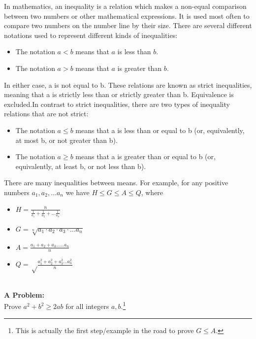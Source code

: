\begin{mathbox}{}
    {In mathematics, an inequality is a relation which makes a non-equal comparison between two numbers or other mathematical expressions.
    It is used most often to compare two numbers on the number line by their size. There are several different notations used to represent different kinds of inequalities:
    \begin{itemize}
        \item{The notation $a < b$ means that $a$ is less than $b$.}
        \item{The notation $a > b$ means that $a$ is greater than $b$.}
    \end{itemize}
    In either case, a is not equal to b. These relations are known as strict inequalities, meaning that a is strictly less than or strictly greater than b. Equivalence is excluded.In contrast to strict inequalities, there are two types of inequality relations that are not strict:
    \begin{itemize}
        \item{The notation $a \leq b$  means that a is less than or equal to b (or, equivalently, at most b, or not greater than b).}
        \item{The notation $a \geq b$  means that a is greater than or equal to b (or, equivalently, at least b, or not less than b).}
    \end{itemize}
    There are many inequalities between means. For example, for any positive numbers $a_1, a_2, \dots a_n$ we have $H \leq G \leq A \leq Q$, where
    \begin{itemize}
        \item{$H = \frac{n}{\frac{1}{a_1} + \frac{1}{a_2} + \dots \frac{1}{a_n}}$}
        \item{$G = \sqrt[n]  {a_1 \cdot a_2 \cdot a_3 \cdot \dots a_n}$}
        \item{$A = \frac{a_1+a_2+a_3......a_n}{n}$}
        \item{$Q = \sqrt \frac{a_1^2 + a_2^2+a_3^2 \dots a_n^2}{n}$}
    \end{itemize}\\
    \textbf{A Problem:}\\
    Prove $a^2 + b^2 \geq 2ab$ for all integers $a, b$.\footnote{This is actually the first step/example in the road to prove $G \leq A.$}}
\end{mathbox}
